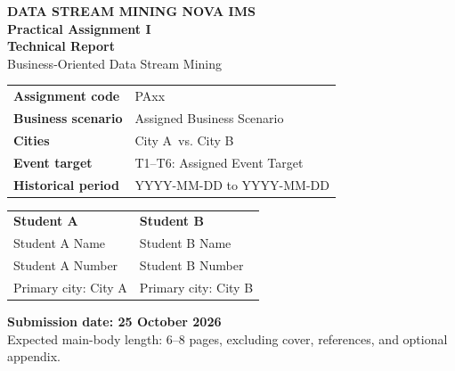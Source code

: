 \documentclass[11pt,a4paper]{article}
\newcommand{\AssignmentCode}{PAxx}
\newcommand{\StudentA}{Student A Name}
\newcommand{\StudentAID}{Student A Number}
\newcommand{\StudentB}{Student B Name}
\newcommand{\StudentBID}{Student B Number}
\newcommand{\CityA}{City A}
\newcommand{\CityB}{City B}
\newcommand{\BusinessScenario}{Assigned Business Scenario}
\newcommand{\EventTarget}{T1--T6: Assigned Event Target}
\newcommand{\HistoricalPeriod}{YYYY-MM-DD to YYYY-MM-DD}
\newcommand{\SubmissionDate}{25 October 2026}
\newif\ifdraftinstructions
\begin{document}

\begin{titlepage}
\pagecolor{Navy}
\color{white}
\vspace*{1.25cm}
{\small\bfseries\color{Mint}\MakeUppercase{Data Stream Mining \;\textbullet\; NOVA IMS}}\\[0.85cm]
{\Huge\bfseries Practical Assignment I}\\[0.30cm]
{\fontsize{25}{29}\selectfont\bfseries Technical Report}\\[0.55cm]
{\Large\color{Mint}Business-Oriented Data Stream Mining}\\[1.05cm]

\begin{tcolorbox}[colback=white!7!Navy,colframe=Mint,boxrule=0.8pt,arc=2mm,left=5mm,right=5mm,top=4mm,bottom=4mm]
\color{white}
\begin{tabularx}{\textwidth}{@{}L{4.3cm}Y@{}}
\textbf{Assignment code} & \AssignmentCode \\
\textbf{Business scenario} & \BusinessScenario \\
\textbf{Cities} & \CityA\ vs. \CityB \\
\textbf{Event target} & \EventTarget \\
\textbf{Historical period} & \HistoricalPeriod \\
\end{tabularx}
\end{tcolorbox}

\vspace{0.75cm}
\begin{tabularx}{\textwidth}{@{}YY@{}}
\textbf{Student A} & \textbf{Student B} \\
\StudentA & \StudentB \\
\StudentAID & \StudentBID \\
Primary city: \CityA & Primary city: \CityB \\
\end{tabularx}

\vfill
{\large\bfseries Submission date: \SubmissionDate}\\[0.15cm]
{\normalsize\color{white!75}Expected main-body length: 6--8 pages, excluding cover, references, and optional appendix.}

\ifdraftinstructions
\vspace{0.55cm}
{\small\bfseries\color{Mint}TEMPLATE MODE - WRITING GUIDANCE IS CURRENTLY VISIBLE}
\fi
\vspace*{0.55cm}
\end{titlepage}
\nopagecolor
\color{BodyText}
\setcounter{page}{1}
\end{document}
